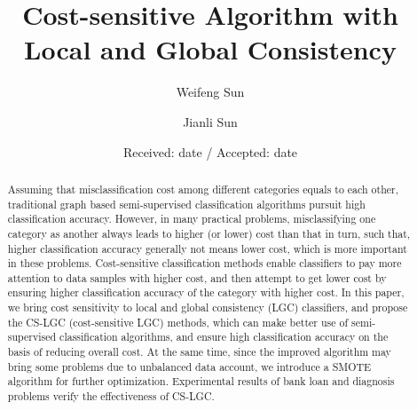 \documentclass{svjour3}                     %
\begin{document}
\title{Cost-sensitive Algorithm
	with Local and Global Consistency%
}
\subtitle{}


\author{Weifeng Sun       \and
        Jianli Sun %
}



\date{Received: date / Accepted: date}


\maketitle

\begin{abstract}
Assuming that misclassification cost among different categories equals to each other, traditional graph based semi-supervised classification algorithms pursuit high classification accuracy. However, in many practical problems, misclassifying one category as another always leads to higher (or lower) cost than that in turn, such that, higher classification accuracy generally not means lower cost, which is more important in these problems. Cost-sensitive classification methods enable classifiers to pay more attention to data samples with higher cost, and then attempt to get lower cost by ensuring higher classification accuracy of the category with higher cost. In this paper, we bring cost sensitivity to local and global consistency (LGC) classifiers, and propose the CS-LGC (cost-sensitive LGC) methods, which can make better use of semi-supervised classification algorithms, and ensure high classification accuracy on the basis of reducing overall cost. At the same time, since the improved algorithm may bring some problems due to unbalanced data account, we introduce a SMOTE algorithm for further optimization. Experimental results of bank loan and diagnosis problems verify the effectiveness of CS-LGC.
\end{abstract}
\end{document}
